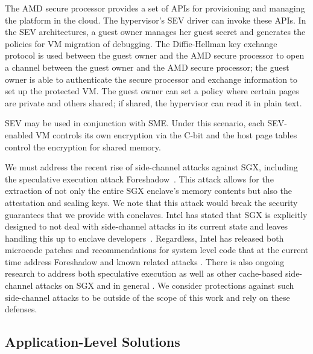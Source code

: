 The AMD secure processor provides a set of APIs for provisioning and managing
the platform in the cloud.
%
The hypervisor's SEV driver can invoke these APIs.
%
In the SEV architectures, a guest owner manages her guest secret and generates
the policies for VM migration of debugging.
%
The Diffie-Hellman key exchange protocol is used between the guest owner and the
AMD secure processor to open a channel between the guest owner and the AMD
secure processor; the guest owner is able to authenticate the secure
processor and exchange information to set up the protected VM.
%
The guest owner can set a policy where certain pages are private and others
shared; if shared, the hypervisor can read it in plain text.


SEV may be used in conjunction with SME.  Under this scenario, each SEV-enabled
VM controls its own encryption via the C-bit and the host page tables control
the encryption for shared memory.


%
We must address the recent rise of side-channel attacks against SGX, including
the speculative execution attack Foreshadow~\cite{foreshadow,
weisse2018foreshadow}.  
%
This attack allows for the extraction of not only the entire SGX enclave's
memory contents but also the attestation and sealing keys.  
%
We note that this attack would break the security guarantees that we provide
with conclaves.
%
Intel has stated that SGX is explicitly designed to not deal with side-channel
attacks in its current state and leaves handling this up to enclave
developers~\cite{sgx-sidechannel, sgx-developers}.
%
Regardless, Intel has released both microcode patches and recommendations for
system level code that at the current time address Foreshadow and known related
attacks \cite{sgx-patch, canella2018systematic, weisse2018foreshadow}.  
%
There is also ongoing research to address both speculative execution as well as
other cache-based side-channel attacks on SGX and in general
\cite{yan2018invisispec, oleksenko2018varys, canella2018systematic, shih2017t}.
%
We consider protections against such side-channel attacks to be outside of the
scope of this work and rely on these defenses.





\subsection{Application-Level Solutions}

